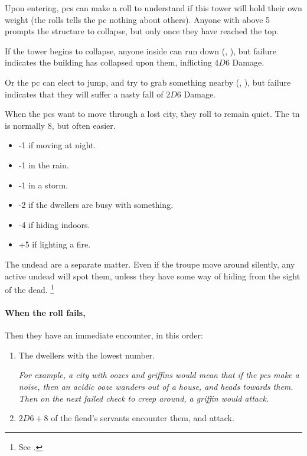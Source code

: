 \begin{multicols}{2}
\begin{dlist}
  Upon entering, \glspl{pc} can make a  roll to understand if this tower will hold their own weight (the rolls tells the \gls{pc} nothing about others).
  Anyone with  above 5 prompts the structure to collapse, but only once they have reached the top.

  If the tower begins to collapse, anyone inside can run down (, \tn[9]), but failure indicates the building has collapsed upon them, inflicting $4D6$ Damage.

  Or the \gls{pc} can elect to jump, and try to grab something nearby (, \tn[12]), but failure indicates that they will suffer a nasty fall of $2D6$ Damage.
\end{dlist}

\bigLine

\label{lostWhispers}

When the \glspl{pc} want to move through a lost city, they roll  to remain quiet.
The \gls{tn} is normally 8, but often easier.

\begin{itemize}
  \item
  -1 if moving at night.
  \item
  -1 in the rain.
  \item
  -1 in a storm.
  \item
  -2 if the dwellers are busy with something.
  \item
  -4 if hiding indoors.
  \item
  +5 if lighting a fire.
\end{itemize}

The undead are a separate matter.
Even if the troupe move around silently, any active undead will spot them, unless they have some way of hiding from the sight of the dead.%
\footnote{See .}

\paragraph{When the roll fails,}
\label{lostChase}

Then they have an immediate encounter, in this order:

\begin{enumerate}
  \item
  The dwellers with the lowest number.

  \textit{For example, a city with oozes and griffins would mean that if the \glspl{pc} make a noise, then an acidic ooze wanders out of a house, and heads towards them.
  Then on the next failed check to creep around, a griffin would attack.}
  \item
  $2D6 + 8$ of the fiend's servants encounter them, and attack.


\end{enumerate}
\end{multicols}
